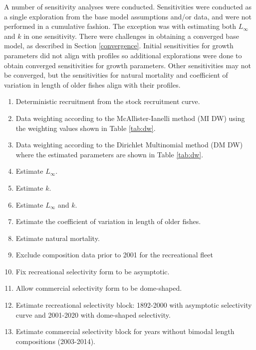 \documentclass[11pt,
  english,
  a4paper,
]{article}
\begin{document}
A number of sensitivity analyses were conducted. Sensitivities were conducted as a single exploration from the base model assumptions and/or data, and were not performed in a cumulative fashion. The exception was with estimating both {\(L_{\infty}\)\leavevmode\tagmcend\tagstructend} and {\(k\)\leavevmode\tagmcend\tagstructend} in one sensitivity. There were challenges in obtaining a converged base model, as described in Section \ref{convergence}. Initial sensitivities for growth parameters did not align with profiles so additional explorations were done to obtain converged sensitivities for growth parameters. Other sensitivities may not be converged, but the sensitivities for natural mortality and coefficient of variation in length of older fishes align with their profiles.

\leavevmode\tagmcend\tagstructend\par

\begin{enumerate}
   
  \item Deterministic recruitment from the stock recruitment curve. 

  \item Data weighting according to the McAllister-Ianelli method (MI DW) using the weighting values shown in Table \ref{tab:dw}. 
  
  \item Data weighting according to the Dirichlet Multinomial method (DM DW) where the estimated parameters are shown in Table \ref{tab:dw}. 

  \item Estimate $L_{\infty}$.
  
  \item Estimate $k$.
  
  \item Estimate $L_{\infty}$ and $k$.

  \item Estimate the coefficient of variation in length of older fishes.

  \item Estimate natural mortality.
  
  \item Exclude composition data prior to 2001 for the recreational fleet

  \item Fix recreational selectivity form to be asymptotic. 
  
  \item Allow commercial selectivity form to be dome-shaped.

  \item Estimate recreational selectivity block: 1892-2000 with asymptotic selectivity curve and 2001-2020 with dome-shaped selectivity.   
  
  \item Estimate commercial selectivity block for years without bimodal length compositions (2003-2014). 
  
\end{enumerate}
\end{document}
